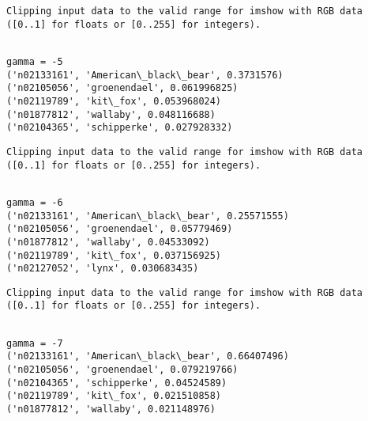 \documentclass[11pt]{article}
\begin{document}
    \begin{Verbatim}[commandchars=\\\{\}]
Clipping input data to the valid range for imshow with RGB data ([0..1] for floats or [0..255] for integers).

    \end{Verbatim}

    \begin{Verbatim}[commandchars=\\\{\}]

gamma = -5
('n02133161', 'American\_black\_bear', 0.3731576)
('n02105056', 'groenendael', 0.061996825)
('n02119789', 'kit\_fox', 0.053968024)
('n01877812', 'wallaby', 0.048116688)
('n02104365', 'schipperke', 0.027928332)

    \end{Verbatim}

    \begin{Verbatim}[commandchars=\\\{\}]
Clipping input data to the valid range for imshow with RGB data ([0..1] for floats or [0..255] for integers).

    \end{Verbatim}

    \begin{Verbatim}[commandchars=\\\{\}]

gamma = -6
('n02133161', 'American\_black\_bear', 0.25571555)
('n02105056', 'groenendael', 0.05779469)
('n01877812', 'wallaby', 0.04533092)
('n02119789', 'kit\_fox', 0.037156925)
('n02127052', 'lynx', 0.030683435)

    \end{Verbatim}

    \begin{Verbatim}[commandchars=\\\{\}]
Clipping input data to the valid range for imshow with RGB data ([0..1] for floats or [0..255] for integers).

    \end{Verbatim}

    \begin{Verbatim}[commandchars=\\\{\}]

gamma = -7
('n02133161', 'American\_black\_bear', 0.66407496)
('n02105056', 'groenendael', 0.079219766)
('n02104365', 'schipperke', 0.04524589)
('n02119789', 'kit\_fox', 0.021510858)
('n01877812', 'wallaby', 0.021148976)

    \end{Verbatim}
\end{document}
